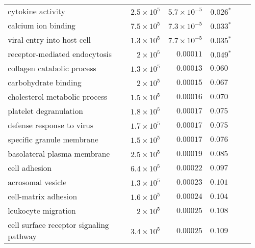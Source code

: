 \begin{longtable*}{|l|r|r|r|r|r|}
    cytokine activity                        & $2.5\times 10^{5}$ & $5.7\times 10^{-5}$  & $\bm{ 0.026{^*}}$               \\
    calcium ion binding                      & $7.5\times 10^{5}$ & $7.3\times 10^{-5}$  & $\bm{ 0.033{^*}}$               \\
    viral entry into host cell               & $1.3\times 10^{5}$ & $7.7\times 10^{-5}$  & $\bm{ 0.035{^*}}$               \\
    receptor-mediated endocytosis            & $ 2\times 10^{5}$  & $0.00011$            & $\bm{ 0.049{^*}}$               \\
    collagen catabolic process               & $1.3\times 10^{5}$ & $0.00013$            & $ 0.060~~$                      \\
    carbohydrate binding                     & $ 2\times 10^{5}$  & $0.00015$            & $ 0.067~~$                      \\
    cholesterol metabolic process            & $1.5\times 10^{5}$ & $0.00016$            & $ 0.070~~$                      \\
    platelet degranulation                   & $1.8\times 10^{5}$ & $0.00017$            & $ 0.075~~$                      \\
    defense response to virus                & $1.7\times 10^{5}$ & $0.00017$            & $ 0.075~~$                      \\
    specific granule membrane                & $1.5\times 10^{5}$ & $0.00017$            & $ 0.076~~$                      \\
    basolateral plasma membrane              & $2.5\times 10^{5}$ & $0.00019$            & $ 0.085~~$                      \\
    cell adhesion                            & $6.4\times 10^{5}$ & $0.00022$            & $ 0.097~~$                      \\
    acrosomal vesicle                        & $1.3\times 10^{5}$ & $0.00023$            & $ 0.101~~$                      \\
    cell-matrix adhesion                     & $1.6\times 10^{5}$ & $0.00024$            & $ 0.104~~$                      \\
    leukocyte migration                      & $ 2\times 10^{5}$  & $0.00025$            & $ 0.108~~$                      \\
    cell surface receptor signaling pathway  & $3.4\times 10^{5}$ & $0.00025$            & $ 0.109~~$                      \\

\end{longtable*}
